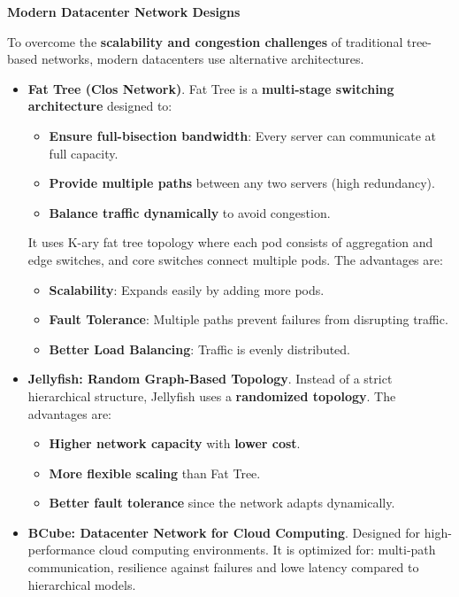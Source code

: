 \highspace
\begin{flushleft}
    \textcolor{Green3}{ \textbf{Modern Datacenter Network Designs}}
\end{flushleft}
To overcome the \textbf{scalability and congestion challenges} of traditional tree-based networks, modern datacenters use alternative architectures.
\begin{itemize}[label=\textcolor{Green3}{}]
    \item \textcolor{Green3}{\textbf{Fat Tree (Clos Network)}}. Fat Tree is a \textbf{multi-stage switching architecture} designed to:
    \begin{itemize}
        \item \textbf{Ensure full-bisection bandwidth}: Every server can communicate at full capacity.
        \item \textbf{Provide multiple paths} between any two servers (high redundancy).
        \item \textbf{Balance traffic dynamically} to avoid congestion.
    \end{itemize}
    It uses K-ary fat tree topology where each pod consists of aggregation and edge switches, and core switches connect multiple pods. The advantages are:
    \begin{itemize}
        \item \textbf{Scalability}: Expands easily by adding more pods.
        \item \textbf{Fault Tolerance}: Multiple paths prevent failures from disrupting traffic.
        \item \textbf{Better Load Balancing}: Traffic is evenly distributed.
    \end{itemize}

    \item \textcolor{Green3}{\textbf{Jellyfish: Random Graph-Based Topology}}. Instead of a strict hierarchical structure, Jellyfish uses a \textbf{randomized topology}. The advantages are:
    \begin{itemize}
        \item \textbf{Higher network capacity} with \textbf{lower cost}.
        \item \textbf{More flexible scaling} than Fat Tree.
        \item \textbf{Better fault tolerance} since the network adapts dynamically.
    \end{itemize}
    
    \item \textcolor{Green3}{\textbf{BCube: Datacenter Network for Cloud Computing}}. Designed for high-performance cloud computing environments. It is optimized for: multi-path communication, resilience against failures and lowe latency compared to hierarchical models.
\end{itemize}

